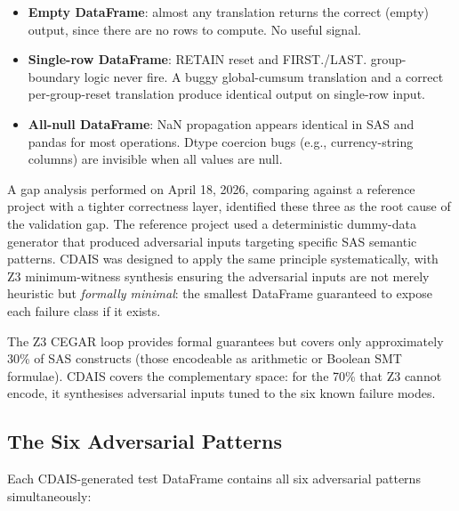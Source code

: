\begin{itemize}
  \item \textbf{Empty DataFrame}: almost any translation returns the correct
    (empty) output, since there are no rows to compute. No useful signal.
  \item \textbf{Single-row DataFrame}: RETAIN reset and FIRST./LAST.
    group-boundary logic never fire. A buggy global-cumsum translation and a
    correct per-group-reset translation produce identical output on single-row input.
  \item \textbf{All-null DataFrame}: NaN propagation appears identical in SAS
    and pandas for most operations. Dtype coercion bugs (e.g., currency-string
    columns) are invisible when all values are null.
\end{itemize}

A gap analysis performed on April 18, 2026, comparing \codara{} against a
reference project with a tighter correctness layer, identified these three as
the root cause of the validation gap. The reference project used a
deterministic dummy-data generator that produced adversarial inputs targeting
specific SAS semantic patterns. CDAIS was designed to apply the same principle
systematically, with Z3 minimum-witness synthesis ensuring the adversarial
inputs are not merely heuristic but \emph{formally minimal}: the smallest
DataFrame guaranteed to expose each failure class if it exists.

The Z3 CEGAR loop provides formal guarantees but covers only approximately
30\% of SAS constructs (those encodeable as arithmetic or Boolean SMT formulae).
CDAIS covers the complementary space: for the 70\% that Z3 cannot encode, it
synthesises adversarial inputs tuned to the six known failure modes.

\subsection{The Six Adversarial Patterns}
\label{subsec:cdais-patterns}

Each CDAIS-generated test DataFrame contains all six adversarial patterns
simultaneously:

